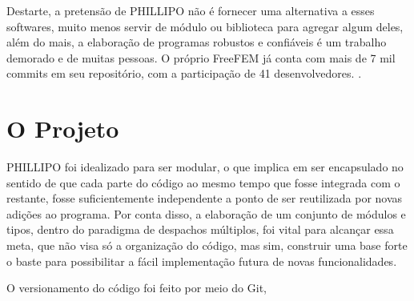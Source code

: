 Destarte, a pretensão de PHILLIPO não é fornecer uma alternativa a esses softwares, muito menos servir de módulo ou biblioteca para agregar algum deles, além do mais, a elaboração de programas robustos e confiáveis é um trabalho demorado e de muitas pessoas. O próprio FreeFEM já conta com mais de 7 mil commits em seu repositório, com a participação de 41 desenvolvedores. \cite{Hecht}. 

\section{O Projeto}

PHILLIPO foi idealizado para ser modular, o que implica em ser encapsulado no sentido de que cada parte do código ao mesmo tempo que fosse integrada com o restante, fosse suficientemente independente a ponto de ser reutilizada por novas adições ao programa. Por conta disso, a elaboração de um conjunto de módulos e tipos, dentro do paradigma de despachos múltiplos, foi vital para alcançar essa meta, que não visa só a organização do código, mas sim, construir uma base forte o baste para possibilitar a fácil implementação futura de novas funcionalidades.

O versionamento do código foi feito por meio do Git, 